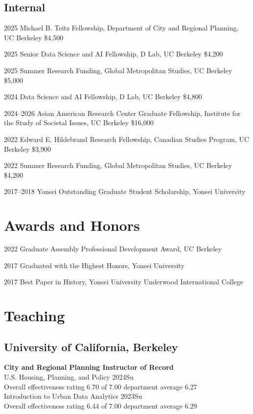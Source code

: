 \documentclass[10pt,letterpaper]{article}
\begin{document}
\subsection{Internal}
\begin{tablist}
  \item[2025] \tab{}Michael B. Teitz Fellowship, Department of City and Regional Planning, UC Berkeley \$4,500
  \item[2025] \tab{}Senior Data Science and AI Fellowship, D Lab, UC Berkeley \$4,200
  \item[2025] \tab{}Summer Research Funding, Global Metropolitan Studies, UC Berkeley \$5,000
  \item[2024] \tab{}Data Science and AI Fellowship, D Lab, UC Berkeley \$4,800
  \item[2024–2026] \tab{}Asian American Research Center Graduate Fellowship, Institute for the Study of Societal Issues, UC Berkeley \$16,000
  \item[2022] \tab{}Edward E. Hildebrand Research Fellowship, Canadian Studies Program, UC Berkeley \$3,900
  \item[2022] \tab{}Summer Research Funding, Global Metropolitan Studies, UC Berkeley \$4,200
  \item[2017–2018] \tab{}Yonsei Outstanding Graduate Student Scholarship, Yonsei University
\end{tablist}

\section{Awards and Honors}

\begin{tablist}
  \item[2022] \tab{}Graduate Assembly Professional Development Award, UC Berkeley
  \item[2017] \tab{}Graduated with the Highest Honors, Yonsei University
  \item[2017] \tab{}Best Paper in History, Yonsei University Underwood International College
\end{tablist}

\section{Teaching}

\subsection{University of California, Berkeley}
\textbf{City and Regional Planning  Instructor of Record}\\[0.3em]
U.S. Housing, Planning, and Policy 2024Su\\
\quad Overall effectiveness rating 6.70 of 7.00 department average 6.27\\[0.3em]
Introduction to Urban Data Analytics 2023Su\\
\quad Overall effectiveness rating 6.44 of 7.00 department average 6.29\\[0.6em]
\end{document}
